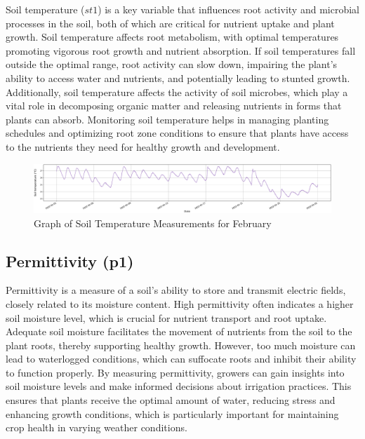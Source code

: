 Soil temperature (\( st1 \)) is a key variable that influences root activity and microbial processes in the soil, both of which are critical for nutrient uptake and plant growth. Soil temperature affects root metabolism, with optimal temperatures promoting vigorous root growth and nutrient absorption. If soil temperatures fall outside the optimal range, root activity can slow down, impairing the plant's ability to access water and nutrients, and potentially leading to stunted growth. Additionally, soil temperature affects the activity of soil microbes, which play a vital role in decomposing organic matter and releasing nutrients in forms that plants can absorb. Monitoring soil temperature helps in managing planting schedules and optimizing root zone conditions to ensure that plants have access to the nutrients they need for healthy growth and development.

\begin{figure}[htbp]
    \centering
    \includegraphics[width=15 cm]{4_ChapterMaterials/figuras/train_data_Soil_temperature.pdf}
    \caption{Graph of Soil Temperature Measurements for February}
    \end{figure}

\subsection{Permittivity (p1)}

Permittivity is a measure of a soil's ability to store and transmit electric fields, closely related to its moisture content. High permittivity often indicates a higher soil moisture level, which is crucial for nutrient transport and root uptake. Adequate soil moisture facilitates the movement of nutrients from the soil to the plant roots, thereby supporting healthy growth. However, too much moisture can lead to waterlogged conditions, which can suffocate roots and inhibit their ability to function properly. By measuring permittivity, growers can gain insights into soil moisture levels and make informed decisions about irrigation practices. This ensures that plants receive the optimal amount of water, reducing stress and enhancing growth conditions, which is particularly important for maintaining crop health in varying weather conditions.

